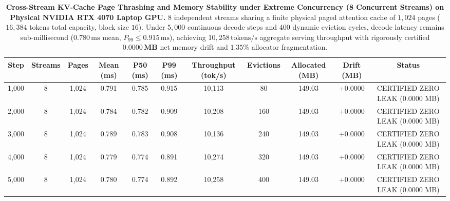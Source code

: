 \documentclass[journal]{IEEEtran}
\begin{document}
\begin{table}[t]
\centering
\small
\caption{\textbf{Cross-Stream KV-Cache Page Thrashing and Memory Stability under Extreme Concurrency (8 Concurrent Streams) on Physical NVIDIA RTX 4070 Laptop GPU.} 8 independent streams sharing a finite physical paged attention cache of $1{,}024$ pages ($16{,}384$ tokens total capacity, block size $16$). Under $5{,}000$ continuous decode steps and $400$ dynamic eviction cycles, decode latency remains sub-millisecond ($0.780\,\text{ms}$ mean, $P_{99} \le 0.915\,\text{ms}$), achieving $10{,}258\,\text{tokens/s}$ aggregate serving throughput with rigorously certified $\mathbf{0.0000\,\text{MB}}$ net memory drift and $1.35\%$ allocator fragmentation.}
\label{tab:paged_cache_thrashing}
\begin{tabular}{ccccccccccc}
\toprule
\textbf{Step} & \textbf{Streams} & \textbf{Pages} & \textbf{Mean (ms)} & \textbf{P50 (ms)} & \textbf{P99 (ms)} & \textbf{Throughput (tok/s)} & \textbf{Evictions} & \textbf{Allocated (MB)} & \textbf{Drift (MB)} & \textbf{Status} \\
\midrule
1,000 & 8 & 1,024 & 0.791 & 0.785 & 0.915 & 10,113 & 80 & 149.03 & +0.0000 & CERTIFIED ZERO LEAK (0.0000 MB) \\
2,000 & 8 & 1,024 & 0.784 & 0.782 & 0.909 & 10,208 & 160 & 149.03 & +0.0000 & CERTIFIED ZERO LEAK (0.0000 MB) \\
3,000 & 8 & 1,024 & 0.789 & 0.783 & 0.908 & 10,136 & 240 & 149.03 & +0.0000 & CERTIFIED ZERO LEAK (0.0000 MB) \\
4,000 & 8 & 1,024 & 0.779 & 0.774 & 0.891 & 10,274 & 320 & 149.03 & +0.0000 & CERTIFIED ZERO LEAK (0.0000 MB) \\
5,000 & 8 & 1,024 & 0.780 & 0.774 & 0.892 & 10,258 & 400 & 149.03 & +0.0000 & CERTIFIED ZERO LEAK (0.0000 MB) \\
\bottomrule
\end{tabular}
\end{table}
\end{document}
